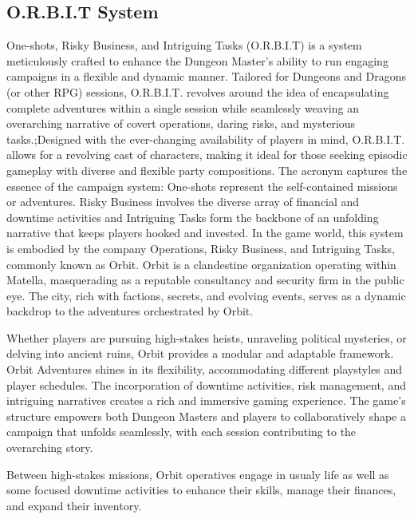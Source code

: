 \subsection{O.R.B.I.T System}

One-shots, Risky Business, and Intriguing Tasks (O.R.B.I.T) is a system meticulously crafted to enhance the Dungeon Master's ability to run engaging campaigns in a flexible and dynamic manner. Tailored for Dungeons and Dragons (or other RPG) sessions, O.R.B.I.T. revolves around the idea of encapsulating complete adventures within a single session while seamlessly weaving an overarching narrative of covert operations, daring risks, and mysterious tasks.;Designed with the ever-changing availability of players in mind, O.R.B.I.T. allows for a revolving cast of characters, making it ideal for those seeking episodic gameplay with diverse and flexible party compositions. The acronym captures the essence of the campaign system: One-shots represent the self-contained missions or adventures. Risky Business involves the diverse array of financial and downtime activities and Intriguing Tasks form the backbone of an unfolding narrative that keeps players hooked and invested. In the game world, this system is embodied by the company Operations, Risky Business, and Intriguing Tasks, commonly known as Orbit. Orbit is a clandestine organization operating within Matella, masquerading as a reputable consultancy and security firm in the public eye. The city, rich with factions, secrets, and evolving events, serves as a dynamic backdrop to the adventures orchestrated by Orbit.

Whether players are pursuing high-stakes heists, unraveling political mysteries, or delving into ancient ruins, Orbit provides a modular and adaptable framework. Orbit Adventures shines in its flexibility, accommodating different playstyles and player schedules. The incorporation of downtime activities, risk management, and intriguing narratives creates a rich and immersive gaming experience. The game's structure empowers both Dungeon Masters and players to collaboratively shape a campaign that unfolds seamlessly, with each session contributing to the overarching story.

Between high-stakes missions, Orbit operatives engage in usualy life as well as some focused downtime activities to enhance their skills, manage their finances, and expand their inventory.


